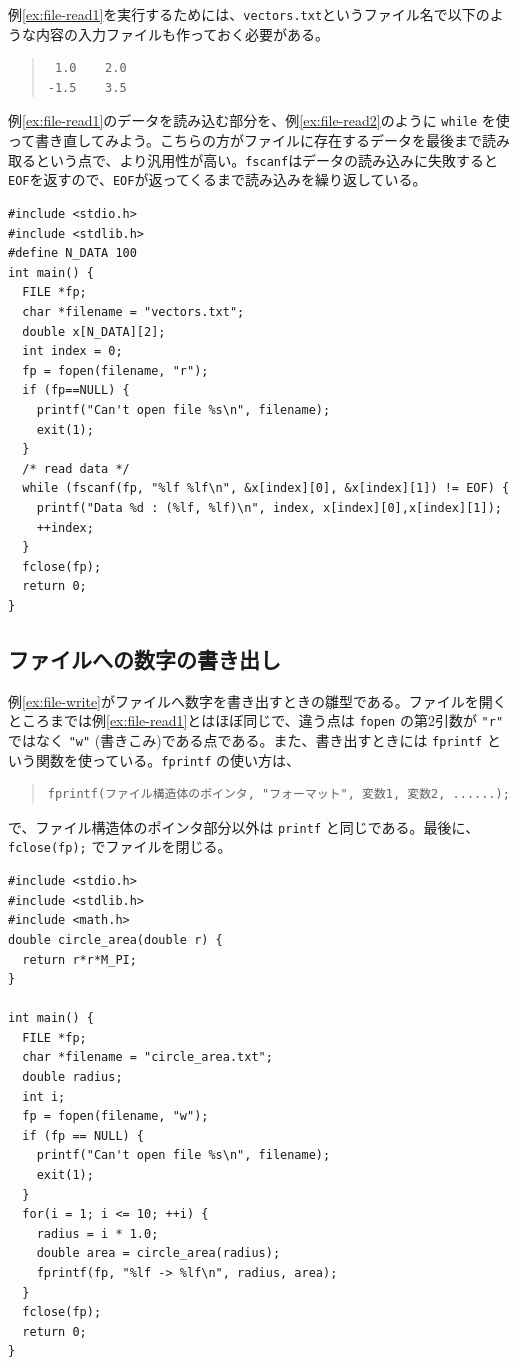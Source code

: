 %
例\ref{ex:file-read1}を実行するためには、{\tt vectors.txt}というファイル名で以下のような内容の入力ファイルも作っておく必要がある。
%
\begin{quote}
\begin{verbatim}
 1.0    2.0
-1.5    3.5
\end{verbatim}
\end{quote}
%
例\ref{ex:file-read1}のデータを読み込む部分を、例\ref{ex:file-read2}のように \verb|while| を使って書き直してみよう。こちらの方がファイルに存在するデータを最後まで読み取るという点で、より汎用性が高い。\verb|fscanf|はデータの読み込みに失敗すると\verb|EOF|を返すので、\verb|EOF|が返ってくるまで読み込みを繰り返している。
%
\begin{reidai}\label{ex:file-read2}
\begin{verbatim}
#include <stdio.h>
#include <stdlib.h>
#define N_DATA 100
int main() {
  FILE *fp;
  char *filename = "vectors.txt";
  double x[N_DATA][2];
  int index = 0;
  fp = fopen(filename, "r");
  if (fp==NULL) {
    printf("Can't open file %s\n", filename);
    exit(1);
  }
  /* read data */
  while (fscanf(fp, "%lf %lf\n", &x[index][0], &x[index][1]) != EOF) {
    printf("Data %d : (%lf, %lf)\n", index, x[index][0],x[index][1]);
    ++index;
  }
  fclose(fp);
  return 0;
}
\end{verbatim}
\end{reidai}
%
\subsection{ファイルへの数字の書き出し}
例\ref{ex:file-write}がファイルへ数字を書き出すときの雛型である。ファイルを開くところまでは例\ref{ex:file-read1}とはほぼ同じで、違う点は \verb|fopen| の第2引数が \verb|"r"| ではなく \verb|"w"| (書きこみ)である点である。また、書き出すときには \verb|fprintf| という関数を使っている。\verb|fprintf| の使い方は、
\begin{quote}
\begin{verbatim}
fprintf(ファイル構造体のポインタ, "フォーマット", 変数1, 変数2, ......);
\end{verbatim}
\end{quote}
%
で、ファイル構造体のポインタ部分以外は \verb|printf| と同じである。最後に、\verb|fclose(fp);| でファイルを閉じる。
%
\begin{reidai}\label{ex:file-write}
\begin{verbatim}
#include <stdio.h>
#include <stdlib.h>
#include <math.h>
double circle_area(double r) {
  return r*r*M_PI;
}

int main() {
  FILE *fp;
  char *filename = "circle_area.txt";
  double radius;
  int i;
  fp = fopen(filename, "w");
  if (fp == NULL) {
    printf("Can't open file %s\n", filename);
    exit(1);
  }
  for(i = 1; i <= 10; ++i) {
    radius = i * 1.0;
    double area = circle_area(radius);
    fprintf(fp, "%lf -> %lf\n", radius, area);
  }
  fclose(fp);
  return 0;
}
\end{verbatim}
\end{reidai}
%

